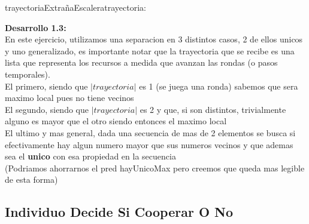 \documentclass[10pt,a4paper]{article}
\begin{document}
\begin{proc}{trayectoriaExtrañaEscalera}{\In trayectoria: \TLista{\float}}{\bool}


\textbf{Desarrollo 1.3:}
\\
En este ejercicio, utilizamos una separacion en 3 distintos casos, 2 de ellos unicos y uno generalizado, es importante notar que la trayectoria que se recibe es una lista que representa los recursos a medida que avanzan las rondas (o pasos temporales).
\\ El primero, siendo que $|\textit{trayectoria}|$ es 1 (se juega una ronda) sabemos que sera maximo local pues no tiene vecinos
\\ El segundo, siendo que $|\textit{trayectoria}|$ es 2 y que, si son distintos, trivialmente alguno es mayor que el otro siendo entonces el maximo local
\\El ultimo y mas general, dada una secuencia de mas de 2 elementos se busca si efectivamente hay algun numero mayor que sus numeros vecinos y que ademas sea el \textbf{unico} con esa propiedad en la secuencia
\\ (Podriamos ahorrarnos el pred hayUnicoMax pero creemos que queda mas legible de esta forma)
\end{proc}

\subsection{Individuo Decide Si Cooperar O No}
\end{document}
